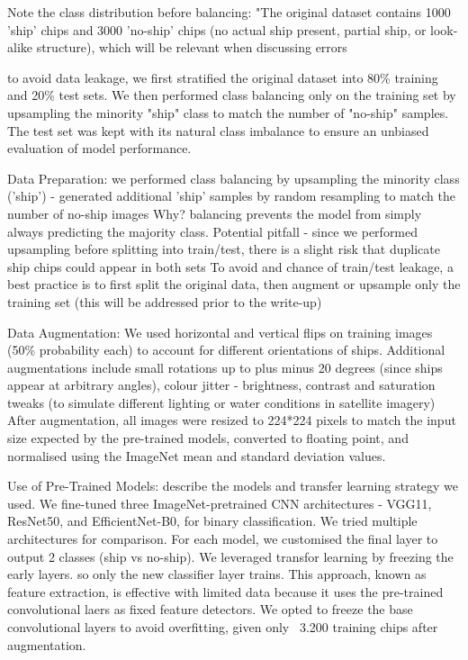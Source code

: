 \documentclass[11pt]{article}
\begin{document}
	Note the class distribution before balancing: "The original dataset contains 1000 'ship' chips and 3000 'no-ship' chips (no actual ship present, partial ship, or look-alike structure), which will be relevant when discussing errors
	
	to avoid data leakage, we first stratified the original dataset into 80\% training and 20\% test sets. We then performed class balancing only on the training set by upsampling the minority "ship" class to match the number of "no-ship" samples. The test set was kept with its natural class imbalance to ensure an unbiased evaluation of model performance.
	
	Data Preparation: we performed class balancing by upsampling the minority class ('ship') - generated additional 'ship' samples by random resampling to match the number of no-ship images
	Why? balancing prevents the model from simply always predicting the majority class.
	Potential pitfall - since we performed upsampling before splitting into train/test, there is a slight risk that duplicate ship chips could appear in both sets
	To avoid and chance of train/test leakage, a best practice is to first split the original data, then augment or upsample only the training set (this will be addressed prior to the write-up)
	
	Data Augmentation: We used horizontal and vertical flips on training images (50\% probability each) to account for different orientations of ships. Additional augmentations include small rotations up to plus minus 20 degrees (since ships appear at arbitrary angles), colour jitter - brightness, contrast and saturation tweaks (to simulate different lighting or water conditions in satellite imagery) After augmentation, all images were resized to 224*224 pixels to match the input size expected by the pre-trained models, converted to floating point, and normalised using the ImageNet mean and standard deviation values.
	
	Use of Pre-Trained Models: describe the models and transfer learning strategy we used. We fine-tuned three ImageNet-pretrained CNN architectures - VGG11, ResNet50, and EfficientNet-B0, for binary classification. We tried multiple architectures for comparison. For each model, we customised the final layer to output 2 classes (ship vs no-ship). We leveraged transfor learning by freezing the early layers. so only the new classifier layer trains. This approach, known as feature extraction, is effective with limited data because it uses the pre-trained convolutional laers as fixed feature detectors. We opted to freeze the base convolutional layers to avoid overfitting, given only ~3.200 training chips after augmentation.
	
\end{document}
